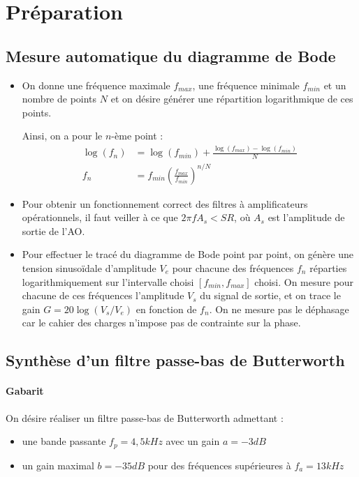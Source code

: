 \documentclass[../../Cours_M1.tex]{subfiles}
\title{\nomTD}
\author{\auteur}
\begin{document}
\maketitle

\section*{Préparation}

\subsection{Mesure automatique du diagramme de Bode}
\begin{itemize}
\item On donne une fréquence maximale $f_{max}$, une fréquence minimale $f_{min}$ et un nombre de points $N$ et on désire générer une répartition logarithmique de ces points.

Ainsi, on a pour le $n$-ème point :
\begin{align*}
\log(f_n) & = \log(f_{min}) + \frac{\log(f_{max})-\log(f_{min})}{N} \\
f_n & = f_{min}(\frac{f_{max}}{f_{min}})^{n/N}
\end{align*}

\item Pour obtenir un fonctionnement correct des filtres à amplificateurs opérationnels, il faut veiller à ce que $2\pi f A_s < SR$, où $A_s$ est l'amplitude de sortie de l'AO.

\item Pour effectuer le tracé du diagramme de Bode point par point, on génère une tension sinusoïdale d'amplitude $V_e$ pour chacune des fréquences $f_n$ réparties logarithmiquement sur l'intervalle choisi $[f_{min},f_{max}]$ choisi.
On mesure pour chacune de ces  fréquences l'amplitude $V_s$ du signal de sortie, et on trace le gain $G=20\log(V_s/V_e)$ en fonction de $f_n$. On ne mesure pas le déphasage car le cahier des charges n'impose pas de contrainte sur la phase.
\end{itemize}

\subsection{Synthèse d'un filtre passe-bas de Butterworth}

\paragraph{Gabarit} On désire réaliser un filtre passe-bas de Butterworth admettant :
\begin{itemize}
\item une bande passante $f_p = 4,5kHz$ avec un gain $a=-3dB$
\item un gain maximal $b=-35dB$ pour des fréquences supérieures à $f_a = 13kHz$
\end{itemize}
\end{document}
